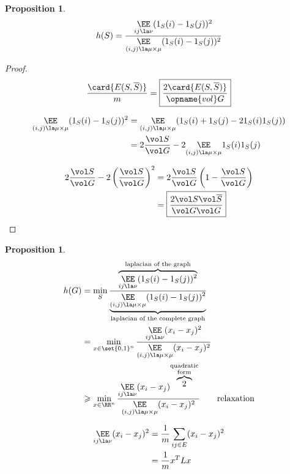 \documentclass[12pt]{article}
\newtheorem{proposition}[lemma]{Proposition}
\begin{document}
\begin{proposition}
    \[
        h(S) = \frac{\underset{ij\la \nu}{\EE}(1_S(i)-1_S(j))^2}{\underset{(i,j)\la\mu\times\mu}{\EE}(1_S(i)-1_S(j))^2}    
    \]
\end{proposition}
\begin{proof}
    \[
        \frac{\card{E(S,\overline{S})}}{m} = \boxed{\frac{2\card{E(S,\overline{S})}}{\opname{vol} G}}
    \]

\[
    \begin{aligned}
        \underset{(i,j)\la\mu\times\mu}{\EE}(1_S(i)-1_S(j))^2 &= \underset{(i,j)\la\mu\times\mu}{\EE}(1_S(i)+1_S(j)-21_S(i)1_S(j))\\
        &= 2 \frac{\vol S}{\vol G} -2\underset{(i,j)\la\mu\times\mu}{\EE}1_S(i)1_S(j)
    \end{aligned}
\]

\[
    \begin{aligned}
        2\frac{\vol S}{\vol G} - 2 \left( \frac{\vol S}{\vol G}\right)^2 &= 2 \frac{\vol S}{\vol G}\left( 1- \frac{\vol S}{\vol G}\right)\\
        &= \boxed{\frac{2 \vol S \vol \overline{S}}{\vol G \vol G}}
    \end{aligned}
\]
\end{proof}

\begin{proposition}
    \[
        \begin{aligned}
            h(G) &= \min\limits_{S} \frac{\overbrace{\underset{ij\la \nu}{\EE}(1_S(i)-1_S(j))^2}^{\text{laplacian of the graph}}}{\underbrace{\underset{(i,j)\la\mu\times\mu}{\EE}(1_S(i)-1_S(j))^2}_{\text{laplacian of the complete graph}}}\\
            &=\min\limits_{x\in\set{0,1}^n} \frac{\underset{ij\la\nu}{\EE}(x_i-x_j)^2}{\underset{(i,j)\la\mu\times\mu}{\EE}(x_i-x_j)^2}\\
            &\geqslant \min\limits_{x\in\RR^n} \frac{\underset{ij\la\nu}{\EE}(x_i-x_j)^{\overbrace{2}^{\substack{\text{quadratic}\\\text{form}}}}}{\underset{(i,j)\la\mu\times\mu}{\EE}(x_i-x_j)^2} \text{\qquad relaxation}
        \end{aligned}
    \]
\end{proposition}


\[
    \begin{aligned}
        \underset{ij\la\nu}{\EE} (x_i-x_j)^2 &= \frac{1}{m} \sum\limits_{ij\in E} (x_i-x_j)^2\\
        &= \frac{1}{m} x^T L x
    \end{aligned}
\]
\end{document}
